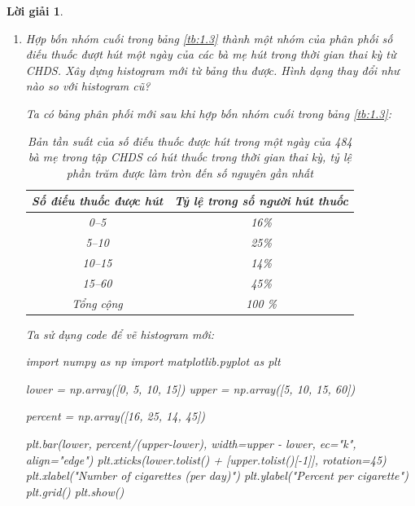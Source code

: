 \documentclass[14pt, a4paper]{article}
\theoremstyle{sltheorem}
\theoremstyle{soltheorem}
\newtheorem*{loigiai}{Lời giải}
\begin{document}
\begin{loigiai}
\begin{enumerate}[wide, labelwidth=!, labelindent=0pt,label=\textbf{\arabic*}.]
        \item Hợp bốn nhóm cuối trong bảng \ref{tb:1.3} thành một nhóm của phân phối số điếu thuốc đượt hút một ngày của các bà mẹ hút trong thời gian thai kỳ từ CHDS.
        Xây dựng histogram mới từ bảng thu được. Hình dạng thay đổi như nào so với histogram cũ?

        Ta có bảng phân phối mới sau khi hợp bốn nhóm cuối trong bảng \ref{tb:1.3}:

        \begin{table}[h!]
            \begin{center}
                \begin{tabular}{|c|c|}
                    \hline
                    \textbf{Số điếu thuốc được hút} & \textbf{Tỷ lệ trong số người hút thuốc} \\  
                    \hline
                    0--5 & 16\% \\  
                    5--10 & 25\% \\  
                    10--15 & 14\% \\  
                    15--60 & 45\% \\  
                    \hline
                    Tổng cộng & 100 \% \\
                    \hline
                \end{tabular}
            \end{center}
            \caption{Bản tần suất của số điếu thuốc được hút trong một ngày của 484 bà mẹ trong tập CHDS có hút thuốc trong thời gian thai kỳ,
            tỷ lệ phần trăm được làm tròn đến số nguyên gần nhất}
        \end{table}

        Ta sử dụng code để vẽ histogram mới:

        \begin{python}
import numpy as np
import matplotlib.pyplot as plt
            
            
lower = np.array([0, 5, 10, 15])
upper = np.array([5, 10, 15, 60])
            
percent = np.array([16, 25, 14, 45])
            
plt.bar(lower, percent/(upper-lower), width=upper - lower, ec="k", align="edge")
plt.xticks(lower.tolist() + [upper.tolist()[-1]], rotation=45)
plt.xlabel("Number of cigarettes (per day)")
plt.ylabel("Percent per cigarette")
plt.grid()
plt.show()
        \end{python}


\end{enumerate}
\end{loigiai}
\end{document}
